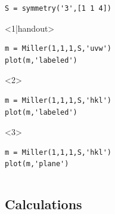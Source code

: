 \begin{frame}[fragile]
\begin{columns}
\begin{column}{5.7cm}
      \begin{lstlisting}
S = symmetry('3',[1 1 4])
  \end{lstlisting}
  \begin{onlyenv}<1|handout>
  \begin{lstlisting}
m = Miller(1,1,1,S,'uvw')
plot(m,'labeled')
  \end{lstlisting}
  \end{onlyenv}
  \begin{onlyenv}<2>
   \begin{lstlisting}
m = Miller(1,1,1,S,'hkl')
plot(m,'labeled')
   \end{lstlisting}
 \end{onlyenv}
 \begin{onlyenv}<3>
   \begin{lstlisting}
m = Miller(1,1,1,S,'hkl')
plot(m,'plane')
   \end{lstlisting}
  \end{onlyenv}
\end{column}
  \end{columns}

\end{frame}

\subsection*{Calculations}

